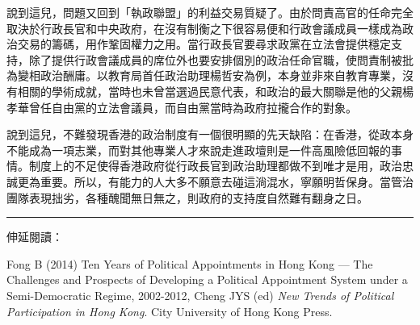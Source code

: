 說到這兒，問題又回到「執政聯盟」的利益交易質疑了。由於問責高官的任命完全取決於行政長官和中央政府，在沒有制衡之下很容易便和行政會議成員一樣成為政治交易的籌碼，用作鞏固權力之用。當行政長官要尋求政黨在立法會提供穩定支持，除了提供行政會議成員的席位外也要安排個別的政治任命官職，使問責制被批為變相政治酬庸。以教育局首任政治助理楊哲安為例，本身並非來自教育專業，沒有相關的學術成就，當時也未曾當選過民意代表，和政治的最大關聯是他的父親楊孝華曾任自由黨的立法會議員，而自由黨當時為政府拉攏合作的對象。

說到這兒，不難發現香港的政治制度有一個很明顯的先天缺陷：在香港，從政本身不能成為一項志業，而對其他專業人才來說走進政壇則是一件高風險低回報的事情。制度上的不足使得香港政府從行政長官到政治助理都做不到唯才是用，政治忠誠更為重要。所以，有能力的人大多不願意去碰這淌混水，寧願明哲保身。當管治團隊表現拙劣，各種醜聞無日無之，則政府的支持度自然難有翻身之日。

\rule[-10pt]{15cm}{0.05em}

伸延閱讀：

Fong B (2014) Ten Years of Political Appointments in Hong Kong — The Challenges and Prospects of Developing a Political Appointment System under a Semi-Democratic Regime, 2002-2012, Cheng JYS (ed) \textit{New Trends of Political Participation in Hong Kong}. City University of Hong Kong Press.